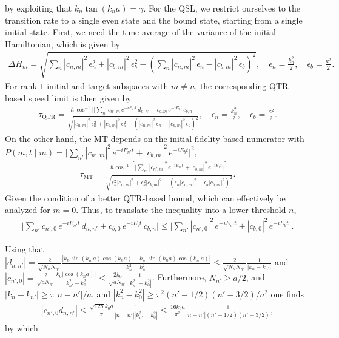 \documentclass[prl,aps,amssymb,twocolumn,superscriptaddress, notitlepage, longbibliography]{revtex4-2}
\begin{document}
by exploiting that $k_n\tan(k_na)=\gamma.$
For the QSL, we restrict ourselves to the transition rate to a single even state and the bound state, starting from a single initial state. First, we need the time-average of the variance of the initial Hamiltonian, which is given by
\begin{eqnarray}
    \Delta H_m = \sqrt{
\sum_n |c_{n,m}|^2 \, \epsilon_n^2 + |c_{b,m}|^2 \, \epsilon_b^2
-
\left( \sum_n |c_{n,m}|^2 \, \epsilon_n - |c_{b,m}|^2 \, \epsilon_b \right)^2
}, \quad
\epsilon_n = \frac{k_n^2}{2}, \quad \epsilon_b = \frac{\kappa^2}{2}.
\end{eqnarray}
For rank-$1$ initial and target subspaces with $m\neq n$, the corresponding QTR-based speed limit is then given by
\begin{eqnarray}
\tau_\mathrm{QTR} =
\frac{
\hbar \, \cos^{-1} \Bigg[
\Bigg|
\sum_{n'} c_{n',m} \, e^{-i E_{n'} t} \, d_{n,n'} + c_{b,m} \, e^{-i E_b t} \, c_{b,n}
\Bigg|
\Bigg]
}
{
\sqrt{
|c_{n,m}|^2 \, \epsilon_n^2 + |c_{b,m}|^2 \, \epsilon_b^2
-
\left( |c_{n,m}|^2 \, \epsilon_n - |c_{b,m}|^2 \, \epsilon_b \right)^2
}
}, \quad
\epsilon_n = \frac{k_n^2}{2}, \quad \epsilon_b = \frac{\kappa^2}{2}.
\end{eqnarray}
On the other hand, the MT depends on the initial fidelity based numerator with $P(m,t \mid m) = \Bigg| \sum_{n'} |c_{n',m}|^2 \, e^{-i E_{n'} t} + |c_{b,m}|^2 \, e^{-i E_b t} \Bigg|^2
$,
\begin{eqnarray}
\tau_\mathrm{MT}=\frac{\hbar\cos^{-1}\left[\Bigg| \sum_{n'} |c_{n',m}|^2 \, e^{-i E_{n'} t} + |c_{b,m}|^2 \, e^{-i E_b t} \Bigg|\right]}{\sqrt{\epsilon^2_n\lvert c_{n,m}\rvert^2+\epsilon^2_b\lvert c_{b,m}\rvert^2-\left(\epsilon_n\lvert c_{n,m}\rvert^2-\epsilon_b\lvert c_{b,m}\rvert^2\right)^2}}.
\end{eqnarray}
Given the condition of a better QTR-based bound, which can effectively be analyzed for $m=0$. Thus, to translate the inequality into a lower threshold $n$,
\begin{eqnarray}
    \Bigg|
\sum_{n'} c_{n',0} \, e^{-i E_{n'} t} \, d_{n,n'} + c_{b,0} \, e^{-i E_b t} \, c_{b,n}
\Bigg|\leq\Bigg| \sum_{n'} |c_{n',0}|^2 \, e^{-i E_{n'} t} + |c_{b,0}|^2 \, e^{-i E_b t} \Bigg|.
\end{eqnarray}

Using that $|d_{n,n'}|=\frac{2}{\sqrt{N_nN_{n'}}}\frac{|k_n\sin(k_{n'}a)\cos(k_na)-k_{n'}\sin(k_na)\cos(k_{n'}a)|}{k^2_n-k^2_{n'}}\leq \frac{2}{\sqrt{N_nN_{n'}}}\frac{1}{|k_n-k_{n'}|}$ and $|c_{n',0}|=\frac{2}{\sqrt{aN_{n'}}}\frac{k_0|\cos(k_na)|}{|k^2_{n'}-k^2_0|}\leq \frac{2k_0}{\sqrt{aN_{n'}}}\frac{1}{|k^2_{n'}-k^2_0|}$. Furthermore, $N_{n'}\geq a/2$, and $|k_n-k_{n'}|\geq\pi|n-n'|/a$, and $|k^2_n-k^2_0|\geq \pi^2(n'-1/2)(n'-3/2)/a^2$ one finds
\begin{eqnarray}
    |c_{n',0}d_{n,n'}|\leq\frac{\sqrt{128}k_0a}{\pi }\frac{1}{|n-n'||k^2_{n'}-k^2_0|}\leq \frac{16k_0a}{\pi^3}\frac{1}{|n-n'|(n'-1/2)(n'-3/2)},
\end{eqnarray}
by which
\end{document}
